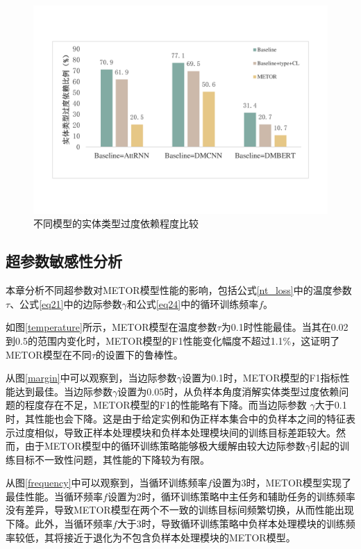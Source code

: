\begin{figure}[htp]
\centering
\includegraphics[width=0.8\linewidth]{figures/chap4/comparison.pdf}
\caption{不同模型的实体类型过度依赖程度比较}
\label{fig-comparison}
\end{figure}

\subsection{超参数敏感性分析}
本章分析不同超参数对METOR模型性能的影响，包括公式\ref{nt_loss}中的温度参数$\tau$、公式\ref{eq21}中的边际参数$\gamma$和公式\ref{eq24}中的循环训练频率$f$。

如图\ref{temperature}所示，METOR模型在温度参数$\tau$为0.1时性能最佳。当其在0.02到0.5的范围内变化时，METOR模型的F1性能变化幅度不超过1.1\%，这证明了METOR模型在不同$\tau$的设置下的鲁棒性。

从图\ref{margin}中可以观察到，当边际参数$\gamma$设置为0.1时，METOR模型的F1指标性能达到最佳。当边际参数$\gamma$设置为0.05时，从负样本角度消解实体类型过度依赖问题的程度存在不足，METOR模型的F1的性能略有下降。而当边际参数 $\gamma$大于0.1时，其性能也会下降。这是由于给定实例和伪正样本集合中的负样本之间的特征表示过度相似，导致正样本处理模块和负样本处理模块间的训练目标差距较大。然而，由于METOR模型中的循环训练策略能够极大缓解由较大边际参数$\gamma$引起的训练目标不一致性问题，其性能的下降较为有限。

从图\ref{frequency}中可以观察到，当循环训练频率$f$设置为3时，METOR模型实现了最佳性能。当循环频率$f$设置为2时，循环训练策略中主任务和辅助任务的训练频率没有差异，导致METOR模型在两个不一致的训练目标间频繁切换，从而性能出现下降。此外，当循环频率$f$大于3时，导致循环训练策略中负样本处理模块的训练频率较低，其将接近于退化为不包含负样本处理模块的METOR模型。

